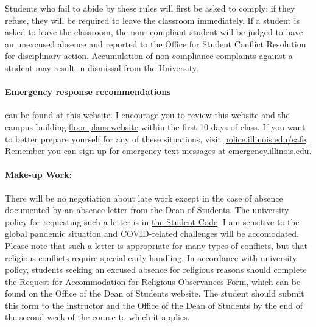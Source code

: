 \documentclass[11pt, a4paper]{article}
\begin{document}
                Students who fail to abide by these rules will first be asked 
                to comply; if they refuse, they will be required to leave the 
                classroom immediately. If a student is asked to leave the 
                classroom, the non- compliant student will be judged to have an 
                unexcused absence and reported to the Office for Student 
                Conflict Resolution for disciplinary action. Accumulation of 
                non-compliance complaints against a student may result in 
                dismissal from the University.  

\paragraph{Emergency response recommendations} can be found at 
        \href{http://police.illinois.edu/emergency-preparedness/}{this website}. 
        I encourage you to review this website and the campus building 
        \href{http://police.illinois.edu/emergency-preparedness/building-emergency-action-plans/}{floor 
        plans website} within the first 10 days of class.  If you want to 
        better prepare yourself for any of these situations, visit 
        \url{police.illinois.edu/safe}. Remember you can sign up for emergency 
        text messages at \url{emergency.illinois.edu}.
\paragraph{Make-up Work:} There will be no negotiation about late work 
        except in the case of absence documented by an absence letter from the 
        Dean of Students. The university policy for requesting such a letter 
        is in 
        \href{http://studentcode.illinois.edu/article1_part5_1-501.html}{the 
        Student Code}. I am sensitive to the global pandemic situation and 
        COVID-related challenges will be accomodated. Please note that such a 
        letter is appropriate for many types of conflicts, but that religious 
        conflicts require special early handling. In accordance with university 
        policy, students seeking an excused absence for religious reasons 
        should complete the Request for Accommodation for Religious Observances 
        Form, which can be found on the Office of the Dean of Students website. 
        The student should submit this form to the instructor and the Office of 
        the Dean of Students by the end of the second week of the course to 
        which it applies.
\end{document}
